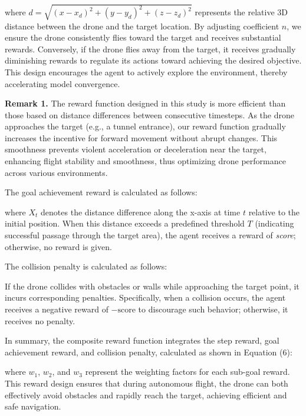 \documentclass[preprint,12pt,authoryear]{elsarticle}
\begin{document}

where \( d = \sqrt{(x - x_d)^2 + (y - y_d)^2 + (z - z_d)^2} \) represents the relative 3D distance between the drone and the target location. By adjusting coefficient \( n \), we ensure the drone consistently flies toward the target and receives substantial rewards. Conversely, if the drone flies away from the target, it receives gradually diminishing rewards to regulate its actions toward achieving the desired objective. This design encourages the agent to actively explore the environment, thereby accelerating model convergence.

\textbf{Remark 1.} The reward function designed in this study is more efficient than those based on distance differences between consecutive timesteps. As the drone approaches the target (e.g., a tunnel entrance), our reward function gradually increases the incentive for forward movement without abrupt changes. This smoothness prevents violent acceleration or deceleration near the target, enhancing flight stability and smoothness, thus optimizing drone performance across various environments.

The goal achievement reward is calculated as follows:


where \( X_t \) denotes the distance difference along the x-axis at time \( t \) relative to the initial position. When this distance exceeds a predefined threshold \( T \) (indicating successful passage through the target area), the agent receives a reward of \textit{score}; otherwise, no reward is given.

The collision penalty is calculated as follows:


If the drone collides with obstacles or walls while approaching the target point, it incurs corresponding penalties. Specifically, when a collision occurs, the agent receives a negative reward of \(-\text{score}\) to discourage such behavior; otherwise, it receives no penalty.

In summary, the composite reward function integrates the step reward, goal achievement reward, and collision penalty, calculated as shown in Equation (6):


where \( w_1 \), \( w_2 \), and \( w_3 \) represent the weighting factors for each sub-goal reward. This reward design ensures that during autonomous flight, the drone can both effectively avoid obstacles and rapidly reach the target, achieving efficient and safe navigation.
\end{document}
